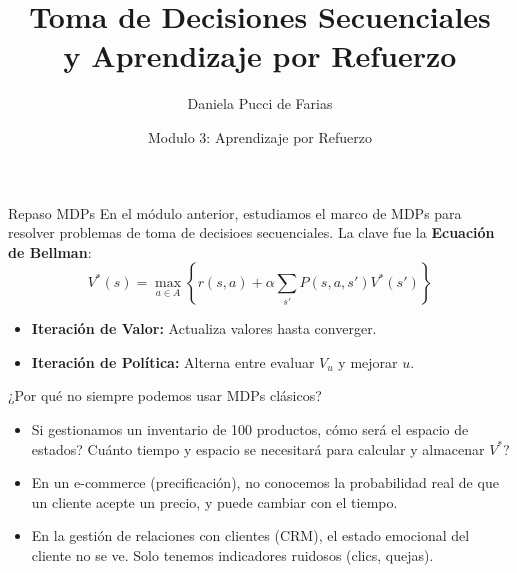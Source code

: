 \documentclass[xcolor=dvipsnames, handout]{beamer}
\title{Toma de Decisiones Secuenciales \\ y Aprendizaje por Refuerzo}
\author{Daniela Pucci de Farias}
\institute{Universidad Torcuato Di Tella}
\date{Modulo 3: Aprendizaje por Refuerzo}
\begin{document}
\frame{\titlepage}

\begin{frame}{Repaso MDPs}
En el m\'odulo anterior, estudiamos el marco de MDPs para resolver problemas de toma de decisioes secuenciales. La clave fue la \textbf{Ecuaci\'on de Bellman}:
\[ V^*(s) = \max_{a \in A} \left\{ r(s,a) + \alpha \sum_{s'} P(s,a,s') V^*(s') \right\} \]

\begin{itemize}
    \item \textbf{Iteraci\'on de Valor:} Actualiza valores hasta converger.
    \item \textbf{Iteraci\'on de Pol\'itica:} Alterna entre evaluar $V_u$  y mejorar $u$.
\end{itemize}

\end{frame}

\begin{frame}{¿Por qu\'e no siempre podemos usar MDPs cl\'asicos?}

\begin{itemize}
    \item Si gestionamos un inventario de 100 productos, \textquestiondown c\'omo ser\'a el espacio de estados? \textquestiondown Cu\'anto tiempo y espacio se necesitar\'a para calcular y almacenar $V^*$?
    
    \item<2-> En un e-commerce (precificaci\'on), no conocemos la probabilidad real de que un cliente acepte un precio, y puede cambiar con el tiempo. 
    
    \item<3-> En la gesti\'on de relaciones con clientes (CRM), el estado emocional del cliente no se ve. Solo tenemos indicadores ruidosos (clics, quejas).
\end{itemize}


\end{frame}
\end{document}
